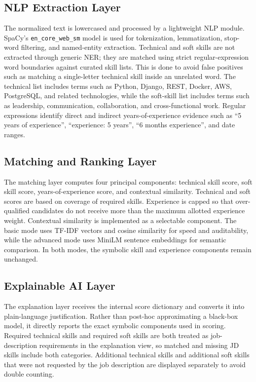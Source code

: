 \subsection{NLP Extraction Layer}
The normalized text is lowercased and processed by a lightweight NLP module. SpaCy's \texttt{en\_core\_web\_sm} model is used for tokenization, lemmatization, stop-word filtering, and named-entity extraction. Technical and soft skills are not extracted through generic NER; they are matched using strict regular-expression word boundaries against curated skill lists. This is done to avoid false positives such as matching a single-letter technical skill inside an unrelated word. The technical list includes terms such as Python, Django, REST, Docker, AWS, PostgreSQL, and related technologies, while the soft-skill list includes terms such as leadership, communication, collaboration, and cross-functional work. Regular expressions identify direct and indirect years-of-experience evidence such as ``5 years of experience'', ``experience: 5 years'', ``6 months experience'', and date ranges.

\subsection{Matching and Ranking Layer}
The matching layer computes four principal components: technical skill score, soft skill score, years-of-experience score, and contextual similarity. Technical and soft scores are based on coverage of required skills. Experience is capped so that over-qualified candidates do not receive more than the maximum allotted experience weight. Contextual similarity is implemented as a selectable component. The basic mode uses TF-IDF vectors and cosine similarity for speed and auditability, while the advanced mode uses MiniLM sentence embeddings for semantic comparison. In both modes, the symbolic skill and experience components remain unchanged.

\subsection{Explainable AI Layer}
The explanation layer receives the internal score dictionary and converts it into plain-language justification. Rather than post-hoc approximating a black-box model, it directly reports the exact symbolic components used in scoring. Required technical skills and required soft skills are both treated as job-description requirements in the explanation view, so matched and missing JD skills include both categories. Additional technical skills and additional soft skills that were not requested by the job description are displayed separately to avoid double counting.

